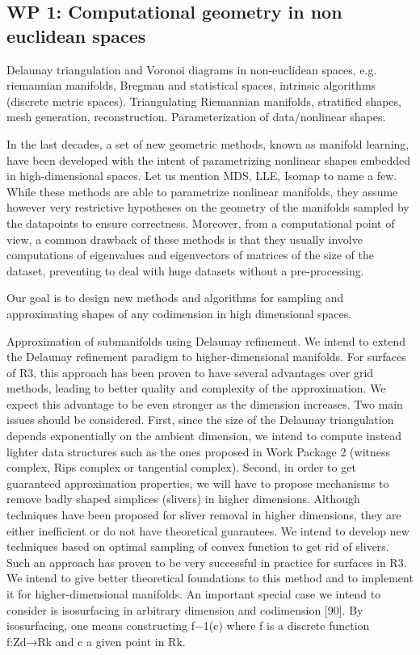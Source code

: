 \subsection*{WP 1: Computational geometry in non euclidean spaces} 
Delaunay triangulation and Voronoi diagrams in non-euclidean spaces, e.g. riemannian manifolds,
Bregman and statistical spaces, intrinsic algorithms (discrete metric spaces). Triangulating Riemannian manifolds, stratified shapes, mesh generation, reconstruction.  Parameterization of data/nonlinear shapes. 

In the last decades, a set of new geometric methods, known as manifold learning, have been developed with the intent of parametrizing nonlinear shapes embedded in high-dimensional spaces. Let us mention MDS, LLE, Isomap to name a few. While these methods are able to parametrize nonlinear manifolds, they assume however very restrictive hypotheses on the geometry of the manifolds sampled by the datapoints to ensure correctness.  Moreover, from a computational point of view, a common drawback of these methods is that they usually involve computations of eigenvalues and eigenvectors of matrices of the size of the dataset, preventing to deal with huge datasets without a pre-processing.

Our goal is to design new methods and algorithms for sampling and approximating shapes of any codimension in high dimensional spaces.

Approximation of submanifolds using Delaunay refinement. We intend to extend the Delaunay refinement paradigm to higher-dimensional manifolds. For surfaces of R3, this approach has been proven to have several advantages over grid methods, leading to better quality and complexity of the approximation. We expect this advantage to be even stronger as the dimension increases. Two main issues should be considered. First, since the size of the Delaunay triangulation depends exponentially on the ambient dimension, we intend to compute instead lighter data structures such as the ones proposed in Work Package 2 (witness complex, Rips complex or tangential complex). Second, in order to get guaranteed approximation properties, we will have to propose mechanisms to remove badly shaped simplices (slivers) in higher dimensions. Although techniques have been proposed for sliver removal in higher dimensions, they are either inefficient or do not have theoretical guarantees. We intend to develop new techniques based on optimal sampling of convex function to get rid of slivers. Such an approach has proven to be very successful in practice for surfaces in R3. We intend to give better theoretical foundations to this method and to implement it for higher-dimensional manifolds. An important special case we intend to consider is isosurfacing in arbitrary dimension and codimension [90]. By isosurfacing, one means constructing f−1(c) where f is a discrete function f:Zd→Rk and c a given point in Rk.

